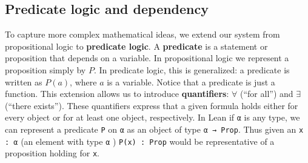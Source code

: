 \subsection{Predicate logic and dependency}
To capture more complex mathematical ideas, we extend our system from
propositional logic to \textbf{predicate logic}.
A \textbf{predicate} is a statement or proposition that depends on a variable.
In propositional logic we represent a proposition simply by $P$.
In predicate logic, this is generalized: a predicate is written as $P(a)$,
where $a$ is a variable. Notice that a predicate is just a function.
This extension allows us to introduce \textbf{quantifiers}:
$\forall$ (``for all'') and $\exists$ (``there exists'').
These quantifiers express that a given formula holds either for every object
or for at least one object, respectively.
In Lean if \lstinline[language=lean]|α| is any type, we can represent a
predicate \lstinline[language=lean]|P| on \lstinline[language=lean]|α| as
an object of type \lstinline[language=lean]|α → Prop|.
Thus given an \lstinline[language=lean]|x : α| (an element
with type \lstinline[language=lean]|α| )
\lstinline[language=lean]|P(x) : Prop| would be representative of a proposition
holding for \lstinline[language=lean]|x|.
